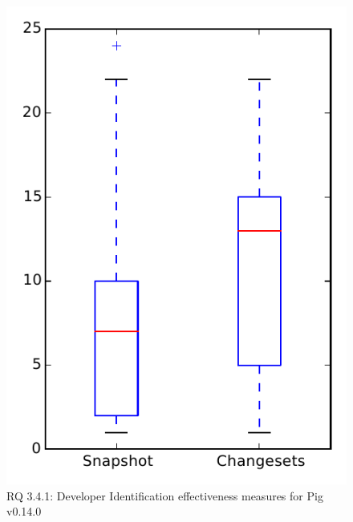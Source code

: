 
\begin{figure}
\centering
\includegraphics[height=0.4\textheight]{figures/dit/rq1_pig}
\caption{RQ 3.4.1: Developer Identification effectiveness measures for Pig v0.14.0}
\label{fig:dit:rq1:pig}
\end{figure}
